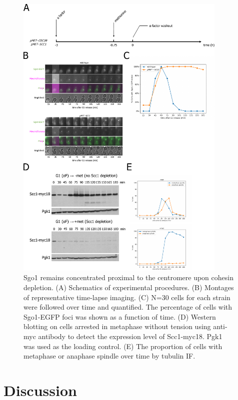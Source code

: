 \begin{figure}[htbp]
  \centering
  \includegraphics[width=0.9\textwidth]{chapter3/figures/Sgo1 pMET-SCC1.pdf}
  \caption[Sgo1 remains concentrated proximal to the centromere upon cohesin depletion]{Sgo1 remains concentrated proximal to the centromere upon cohesin depletion. (A) Schematics of experimental procedures. (B) Montages of representative time-lapse imaging. (C) N=30 cells for each strain were followed over time and quantified. The percentage of cells with Sgo1-EGFP foci was shown as a function of time. (D) Western blotting on cells arrested in metaphase without tension using anti-myc antibody to detect the expression level of Scc1-myc18. Pgk1 was used as the loading control. (E) The proportion of cells with metaphase or anaphase spindle over time by tubulin IF.}
  \label{fig:sgo1metscc1}
\end{figure}


\section{Discussion}
